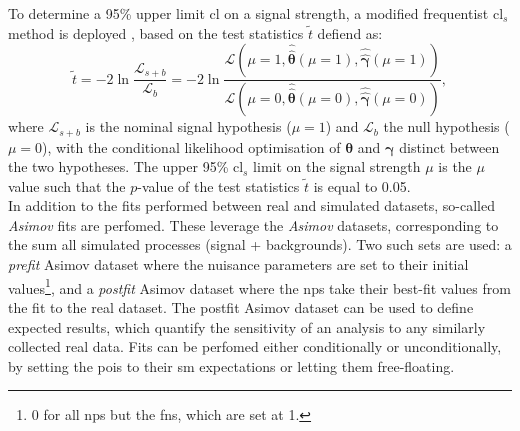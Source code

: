 To determine a 95\% upper limit \gls{cl} on a signal strength, a modified frequentist \gls{cl}$_s$ method is deployed \cite{asympForm, ALRead_2002}, based on the test statistics $\tilde{t}$ defiend as:
\begin{equation}
    \tilde{t} = -2 \ln \frac{\mathcal{L}_{s+b}}{\mathcal{L}_{b}} = -2 \ln \frac{\mathcal{L}\left(\mu = 1, \hat{\hat{\boldsymbol{\theta}}}(\mu = 1), \hat{\hat{\boldsymbol{\gamma}}}(\mu = 1) \right)}{\mathcal{L}\left(\mu = 0, \hat{\hat{\boldsymbol{\theta}}}(\mu = 0), \hat{\hat{\boldsymbol{\gamma}}}(\mu = 0) \right)},
\end{equation}
where $\mathcal{L}_{s+b}$ is the nominal signal hypothesis ($\mu = 1$) and $\mathcal{L}_{b}$ the null hypothesis ($\mu = 0$), with the conditional likelihood optimisation of $\boldsymbol{\theta}$ and $\boldsymbol{\gamma}$ distinct between the two hypotheses. The upper 95\% \gls{cl}$_s$ limit on the signal strength $\mu$ is the $\mu$ value such that the $p$-value of the test statistics $\tilde{t}$ is equal to 0.05.\\

In addition to the fits performed between real and simulated datasets, so-called \textit{Asimov} fits are perfomed. These leverage the \textit{Asimov} datasets, corresponding to the sum all simulated processes (signal + backgrounds). Two such sets are used: a \textit{prefit} Asimov dataset where the nuisance parameters are set to their initial values\footnote{0 for all \gls{np}s but the \gls{fn}s, which are set at 1.}, and a \textit{postfit} Asimov dataset where the \gls{np}s take their best-fit values from the fit to the real dataset. The postfit Asimov dataset can be used to define expected results, which quantify the sensitivity of an analysis to any similarly collected real data. Fits can be perfomed either conditionally or unconditionally, by setting the \gls{poi}s to their \gls{sm} expectations or letting them free-floating. 

